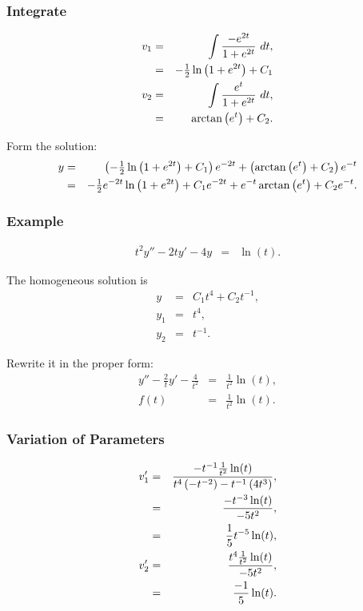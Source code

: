 \begin{frame}
  \frametitle{Integrate}
  
  \begin{eqnarray*}
    v_1 & = & \int \frac{-e^{2t}}{1+e^{2t}} ~ dt, \\
    & = & -\mbox{$\frac{1}{2}$} \ln\left( 1 + e^{2t} \right) + C_1 \\
    v_2 & = & \int \frac{e^t}{1+e^{2t}} ~ dt, \\
    & = & \arctan\left( e^t \right) + C_2.
  \end{eqnarray*}

  Form the solution:
  \begin{eqnarray*}
    y & = & \left( -\mbox{$\frac{1}{2}$} \ln\left( 1 + e^{2t} \right) + C_1 \right) e^{-2t} + \left( \arctan\left( e^t \right) + C_2 \right) e^{-t} \\
    & = & -\mbox{$\frac{1}{2}$} e^{-2t} \ln \left( 1 + e^{2t} \right) + C_1 e^{-2t} + e^{-t} \arctan\left( e^t \right) + C_2 e^{-t}.
  \end{eqnarray*}

\end{frame}


\begin{frame}
  \frametitle{Example}
  \begin{eqnarray*}
    t^2 y'' - 2t y' - 4y & = & \ln(t).
  \end{eqnarray*}

  {

    The homogeneous solution is 
    \begin{eqnarray*}
      y & = & C_1 t^4 + C_2 t^{-1}, \\
      y_1 & = & t^4, \\
      y_2 & = & t^{-1}.
    \end{eqnarray*}

    Rewrite it in the proper form:
    \begin{eqnarray*}
      y'' - \frac{2}{t} y' - \frac{4}{t^2} & = & \frac{1}{t^2} \ln(t), \\
      f(t) & = & \frac{1}{t^2} \ln(t).
    \end{eqnarray*}

  }
\end{frame}

\begin{frame}
  \frametitle{Variation of Parameters}

  \begin{eqnarray*}
    v_1' & = & \frac{-t^{-1}\frac{1}{t^2}\ln(t)}{t^4 \left( -t^{-2} \right) - t^{-1} \left( 4 t^3 \right)}, \\
    & = & \frac{-t^{-3}\ln(t)}{-5t^2}, \\
    & = & \frac{1}{5} t^{-5} \ln(t), \\
    v_2' & = & \frac{t^4 \frac{1}{t^2} \ln(t)}{-5t^2}, \\
    & = & \frac{-1}{5} \ln(t).
  \end{eqnarray*}
  

\end{frame}

